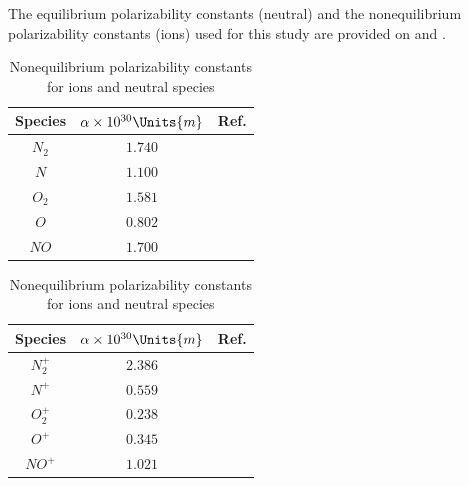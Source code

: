     The equilibrium polarizability constants (neutral) and the nonequilibrium
    polarizability constants (ions) used for this study are provided on
     and
    .
           \begin{table}[H]
               \begin{minipage}[b]{0.49\textwidth}
        	    \centering
                    \begin{tabular}{| c | c | c |}
                        \hline 
                        Species  & $\alpha \times 10^{30}\Units{m}$ & Ref.             \\
                        \hline \hline 
                        $N_2$      & $1.740$                               &\cite{Haynes2004}\\
                        $N$               & $1.100$                               &\cite{Haynes2004}\\
                        $O_2$      & $1.581$                               &\cite{Haynes2004}\\
                        $O$               & $0.802$                               &\cite{Haynes2004}\\
                        $NO$              & $1.700$                               &\cite{Haynes2004}\\
                        \hline 
                    \end{tabular} 
                \caption{Equilibrium polarizability constants for ions and neutral
               species\label{tab:ionizationStudyEquilibriumPolarizability}}
                \end{minipage} \hfill
               \begin{minipage}[b]{0.49\textwidth}
                   \centering
                    \begin{tabular}{| c | c | c |}
                        \hline
                        Species  & $\alpha \times 10^{30}\Units{m}$ & Ref.             \\
                        \hline\hline
                        $N_2^+$ & $2.386$                               &\cite{McCormack1991}\\
                        $N^+$       & $0.559$                               &\cite{Jacobson1996}\\
                        $O_2^+$ & $0.238$                               &\cite{Stewart1975}\\
                        $O^+$       & $0.345$                               &\cite{Stewart1975}\\
                        $NO^+$      & $1.021$                               &\cite{Feher1993}\\
                        \hline 
                    \end{tabular}
                    \caption{Nonequilibrium polarizability constants for ions and neutral
                       species\label{tab:ionizationStudyNonequilibriumPolarizability}}
               \end{minipage}
        \end{table}




